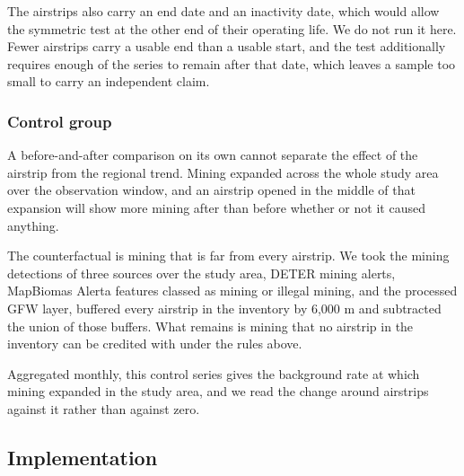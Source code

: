 \documentclass[11pt]{article}
\begin{document}
The airstrips also carry an end date and an inactivity date, which would allow the symmetric test at the other end of their operating life. We do not run it here. Fewer airstrips carry a usable end than a usable start, and the test additionally requires enough of the series to remain after that date, which leaves a sample too small to carry an independent claim.

\subsubsection{Control group}

A before-and-after comparison on its own cannot separate the effect of the airstrip from the regional trend. Mining expanded across the whole study area over the observation window, and an airstrip opened in the middle of that expansion will show more mining after than before whether or not it caused anything.

The counterfactual is mining that is far from every airstrip. We took the mining detections of three sources over the study area, DETER mining alerts, MapBiomas Alerta features classed as mining or illegal mining, and the processed GFW layer, buffered every airstrip in the inventory by 6{,}000 m and subtracted the union of those buffers. What remains is mining that no airstrip in the inventory can be credited with under the rules above.

Aggregated monthly, this control series gives the background rate at which mining expanded in the study area, and we read the change around airstrips against it rather than against zero.


\subsection{Implementation}
\end{document}
